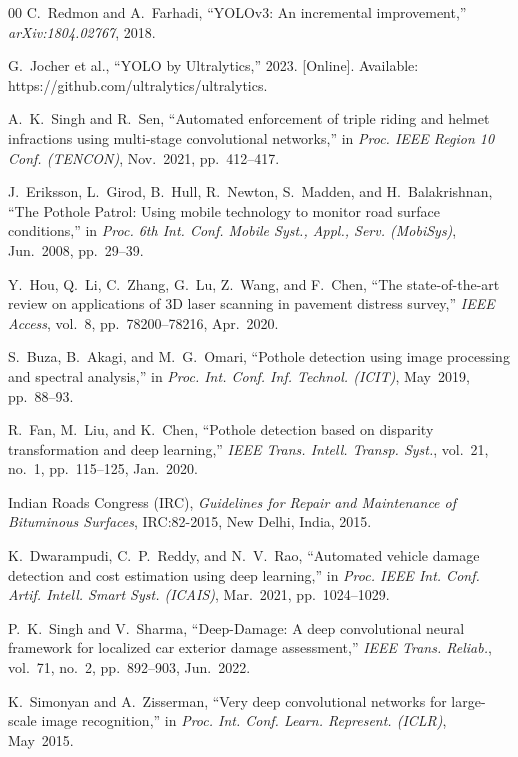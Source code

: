 \documentclass[journal,compsoc]{IEEEtran}
\begin{document}
\begin{thebibliography}{00}
C.~Redmon and A.~Farhadi, ``YOLOv3: An incremental improvement,'' \textit{arXiv:1804.02767}, 2018.

G.~Jocher et al., ``YOLO by Ultralytics,'' 2023. [Online]. Available: https://github.com/ultralytics/ultralytics.

A.~K.~Singh and R.~Sen, ``Automated enforcement of triple riding and helmet infractions using multi-stage convolutional networks,'' in \textit{Proc. IEEE Region 10 Conf. (TENCON)}, Nov.~2021, pp.~412--417.

J.~Eriksson, L.~Girod, B.~Hull, R.~Newton, S.~Madden, and H.~Balakrishnan, ``The Pothole Patrol: Using mobile technology to monitor road surface conditions,'' in \textit{Proc. 6th Int. Conf. Mobile Syst., Appl., Serv. (MobiSys)}, Jun.~2008, pp.~29--39.

Y.~Hou, Q.~Li, C.~Zhang, G.~Lu, Z.~Wang, and F.~Chen, ``The state-of-the-art review on applications of 3D laser scanning in pavement distress survey,'' \textit{IEEE Access}, vol.~8, pp.~78200--78216, Apr.~2020.

S.~Buza, B.~Akagi, and M.~G.~Omari, ``Pothole detection using image processing and spectral analysis,'' in \textit{Proc. Int. Conf. Inf. Technol. (ICIT)}, May~2019, pp.~88--93.

R.~Fan, M.~Liu, and K.~Chen, ``Pothole detection based on disparity transformation and deep learning,'' \textit{IEEE Trans. Intell. Transp. Syst.}, vol.~21, no.~1, pp.~115--125, Jan.~2020.

Indian Roads Congress (IRC), \textit{Guidelines for Repair and Maintenance of Bituminous Surfaces}, IRC:82-2015, New Delhi, India, 2015.

K.~Dwarampudi, C.~P.~Reddy, and N.~V.~Rao, ``Automated vehicle damage detection and cost estimation using deep learning,'' in \textit{Proc. IEEE Int. Conf. Artif. Intell. Smart Syst. (ICAIS)}, Mar.~2021, pp.~1024--1029.

P.~K.~Singh and V.~Sharma, ``Deep-Damage: A deep convolutional neural framework for localized car exterior damage assessment,'' \textit{IEEE Trans. Reliab.}, vol.~71, no.~2, pp.~892--903, Jun.~2022.

K.~Simonyan and A.~Zisserman, ``Very deep convolutional networks for large-scale image recognition,'' in \textit{Proc. Int. Conf. Learn. Represent. (ICLR)}, May~2015.


\end{thebibliography}
\end{document}
